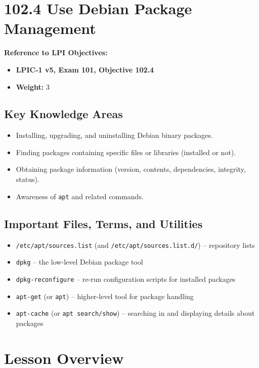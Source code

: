 \documentclass[a4paper]{report}
\begin{document}
\newpage

\section*{102.4 Use Debian Package Management}

\textbf{Reference to LPI Objectives:}
\begin{itemize}
    \item \textbf{LPIC-1 v5, Exam 101, Objective 102.4}
    \item \textbf{Weight:} 3
\end{itemize}

\subsection*{Key Knowledge Areas}
\begin{itemize}
    \item Installing, upgrading, and uninstalling Debian binary packages.
    \item Finding packages containing specific files or libraries (installed or not).
    \item Obtaining package information (version, contents, dependencies, integrity, status).
    \item Awareness of \texttt{apt} and related commands.
\end{itemize}

\subsection*{Important Files, Terms, and Utilities}
\begin{itemize}
    \item \texttt{/etc/apt/sources.list} (and \texttt{/etc/apt/sources.list.d/}) – repository lists
    \item \texttt{dpkg} – the low-level Debian package tool
    \item \texttt{dpkg-reconfigure} – re-run configuration scripts for installed packages
    \item \texttt{apt-get} (or \texttt{apt}) – higher-level tool for package handling
    \item \texttt{apt-cache} (or \texttt{apt search/show}) – searching in and displaying details about packages
\end{itemize}

\section*{Lesson Overview}
\end{document}
